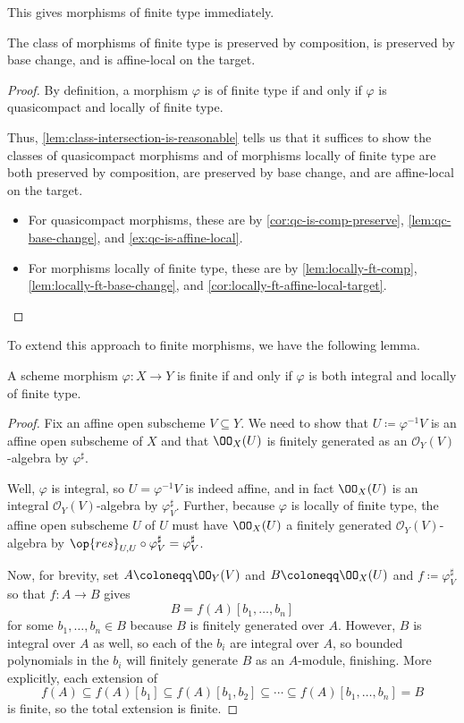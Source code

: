 \documentclass[../notes.tex]{subfiles}
\begin{document}
This gives morphisms of finite type immediately.
\begin{corollary} \label{cor:ft-is-reasonable}
	The class of morphisms of finite type is preserved by composition, is preserved by base change, and is affine-local on the target.
\end{corollary}
\begin{proof}
	By definition, a morphism $\varphi$ is of finite type if and only if $\varphi$ is quasicompact and locally of finite type.
	
	Thus, \autoref{lem:class-intersection-is-reasonable} tells us that it suffices to show the classes of quasicompact morphisms and of morphisms locally of finite type are both preserved by composition, are preserved by base change, and are affine-local on the target.
	\begin{itemize}
		\item For quasicompact morphisms, these are by \autoref{cor:qc-is-comp-preserve}, \autoref{lem:qc-base-change}, and \autoref{ex:qc-is-affine-local}.
		\item For morphisms locally of finite type, these are by \autoref{lem:locally-ft-comp}, \autoref{lem:locally-ft-base-change}, and \autoref{cor:locally-ft-affine-local-target}.
		\qedhere
	\end{itemize}
\end{proof}
To extend this approach to finite morphisms, we have the following lemma.
\begin{lemma} \label{lem:finite-is-integral-locally-ft}
	A scheme morphism $\varphi\colon X\to Y$ is finite if and only if $\varphi$ is both integral and locally of finite type.
\end{lemma}
\begin{proof}
	Fix an affine open subscheme $V\subseteq Y$. We need to show that $U\coloneqq\varphi^{-1}V$ is an affine open subscheme of $X$ and that $\OO_X(U)$ is finitely generated as an $\mathcal O_Y(V)$-algebra by $\varphi^\sharp$.
	
	Well, $\varphi$ is integral, so $U=\varphi^{-1}V$ is indeed affine, and in fact  $\OO_X(U)$ is an integral $\mathcal O_Y(V)$-algebra by $\varphi^\sharp_V$. Further, because $\varphi$ is locally of finite type, the affine open subscheme $U$ of $U$ must have $\OO_X(U)$ a finitely generated $\mathcal O_Y(V)$-algebra by ${\op{res}_{U,U}}\circ\varphi^\sharp_V=\varphi^\sharp_V$.

	Now, for brevity, set $A\coloneqq\OO_Y(V)$ and $B\coloneqq\OO_X(U)$ and $f\coloneqq\varphi^\sharp_V$ so that $f\colon A\to B$ gives
	\[B=f(A)[b_1,\ldots,b_n]\]
	for some $b_1,\ldots,b_n\in B$ because $B$ is finitely generated over $A$. However, $B$ is integral over $A$ as well, so each of the $b_i$ are integral over $A$, so bounded polynomials in the $b_i$ will finitely generate $B$ as an $A$-module, finishing. More explicitly, each extension of
	\[f(A)\subseteq f(A)[b_1]\subseteq f(A)[b_1,b_2]\subseteq\cdots\subseteq f(A)[b_1,\ldots,b_n]=B\]
	is finite, so the total extension is finite.
\end{proof}
\end{document}
